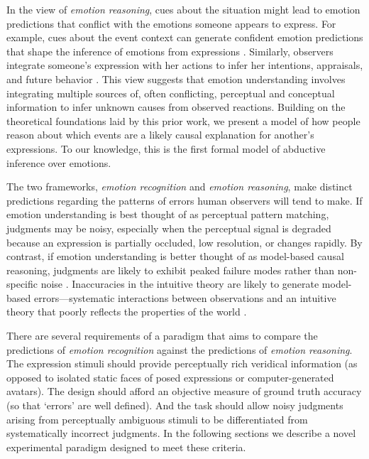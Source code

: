\documentclass[10pt,letterpaper]{article}
\begin{document}
In the view of {\em emotion reasoning}, 
cues about the situation might lead to emotion predictions that conflict with the emotions someone appears to express. For example, cues about the event context can generate confident emotion predictions that shape the inference of emotions from expressions \citep{anzellotti2021emotion, ong2015cueint}. Similarly, observers integrate someone's expression with her actions to infer her intentions, appraisals, and future behavior \citep{demelo2014readingmindsexpressions}.
This view suggests that emotion understanding involves integrating multiple sources of, often conflicting, perceptual and conceptual information to infer unknown causes from observed reactions. Building on the theoretical foundations laid by this prior work, we present a model of how people reason about which events are a likely causal explanation for another's expressions. To our knowledge, this is the first formal model of abductive inference over emotions.

The two frameworks, {\em emotion recognition} and {\em emotion reasoning}, make distinct predictions regarding the patterns of errors human observers will tend to make.
If emotion understanding is best thought of as perceptual pattern matching, 
judgments may be noisy, especially when the perceptual signal is degraded because an expression is partially occluded, low resolution, or changes rapidly.
By contrast, if emotion understanding is better thought of as model-based causal reasoning, 
judgments are likely to exhibit peaked failure modes rather than non-specific noise \citep{kruger1999naivecynicism, gopnik1993selfknowledge, saxe2005argumentfromerror}.
Inaccuracies in the intuitive theory are likely to generate model-based errors---systematic interactions between observations and an intuitive theory that poorly reflects the properties of the world \citep{gopnik1994theorytheory}. 


There are several requirements of a paradigm that aims to compare the predictions of {\em emotion recognition} 
against the predictions of {\em emotion reasoning}. 
The expression stimuli should provide perceptually rich veridical information (as opposed to isolated static faces of posed expressions or computer-generated avatars). The design should afford an objective measure of ground truth accuracy (so that `errors' are well defined). And the task should allow noisy judgments arising from perceptually ambiguous stimuli to be differentiated from systematically incorrect judgments. In the following sections we describe a novel experimental paradigm designed to meet these criteria.
\end{document}
